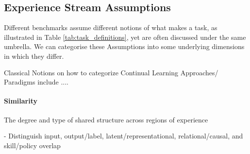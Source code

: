 \documentclass{article}
\begin{document}
            \subsection{Experience Stream Assumptions}
        
            Different benchmarks assume different notions of what makes a task, as illustrated in Table \ref{tab:task_definitions}, yet are often discussed under the same umbrella. We can categorise these Assumptions into some underlying dimensions in which they differ. %
            
    
    
    
            Classical Notions on how to categorize Continual Learning Approaches/ Paradigms include .... 
            
    
    
            
            \paragraph{Similarity}

            
            The degree and type of shared structure across regions of experience
            
            - Distinguish input, output/label, latent/representational, relational/causal, and skill/policy overlap
            
\end{document}
